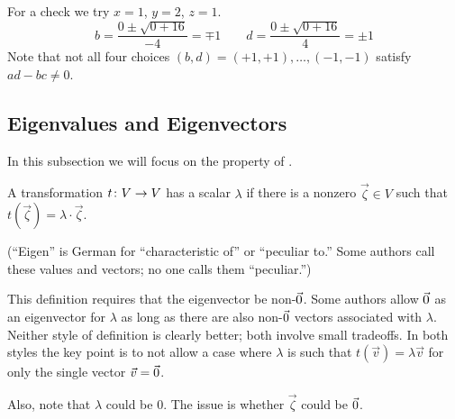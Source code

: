 \begin{exercises}
\begin{answer}
\begin{exparts}
        For a check we try \( x=1 \), \( y=2 \), \( z=1 \).
        \begin{equation*}
           b=\frac{0\pm\sqrt{0+16} }{-4}=\mp 1
           \qquad
           d=\frac{0\pm\sqrt{0+16} }{4}=\pm 1
        \end{equation*}
        Note that not all four choices \( (b,d)=(+1,+1),\dots,(-1,-1) \)
        satisfy \( ad-bc\neq 0 \).
      \end{exparts} 
    \end{answer}
\end{exercises}































\subsection{Eigenvalues and Eigenvectors}
In this subsection we will focus on the
property of .

\begin{definition} \label{def:Eigen}
A transformation \( \mbox{$t\colon V\to V$} \) has a scalar
%
\( \lambda \)
if there is a nonzero  \( \vec{\zeta}\in V \)
such that
$
  t(\vec{\zeta})=\lambda\cdot\vec{\zeta}
$.
\end{definition}

\noindent (``Eigen'' is German for ``characteristic of'' or ``peculiar to.'' 
Some authors call these %
 values and vectors;
no one calls them ``peculiar.'')

\begin{remark}
This definition requires that the eigenvector be non-$\vec{0}$.
Some authors allow $\vec{0}$ as
an eigenvector for $\lambda$ as long as there are also
non-$\vec{0}$ vectors associated with $\lambda$.
Neither style  of definition is clearly better; both involve small tradeoffs.
In both styles the key point is 
to not allow a case where $\lambda$ is such that
$t(\vec{v})=\lambda\vec{v}$ for only the single vector $\vec{v}=\vec{0}$.

Also, note that $\lambda$ could be $0$.
The issue is whether $\vec{\zeta}$ could be $\vec{0}$.  
\end{remark}

